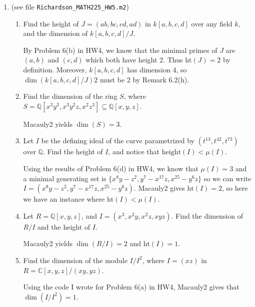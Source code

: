 \documentclass[11pt,oneside,english]{amsart}
\theoremstyle{definition}
\begin{document}
\begin{enumerate}[leftmargin=*]
\pagebreak

\item (see file \verb!Richardson_MATH225_HW5.m2!)

\begin{enumerate}
\item Find the height of $J = (ab,bc,cd,ad)$ in $k[a,b,c,d]$ over any field $k$, and the dimension of $k[a,b,c,d]/J$.

By Problem 6(b) in HW4, we know that the minimal primes of $J$ are $(a,b)$ and $(c,d)$ which both have height 2. Thus $\text{ht}(J)=2$ by definition. Moreover, $k[a,b,c,d]$ has dimension 4, so $\dim(k[a,b,c,d]/J)2$ must be 2 by Remark 6.2(h).
 
\item Find the dimension of the ring $S$, where $S = \mathbb{Q}[x^3y^3, x^3y^2z, x^2z^3] \subseteq \mathbb{Q}[x,y,z]$.

Macauly2 yields $\dim(S)=3$.

\item Let $I$ be the defining ideal of the curve parametrized by $(t^{13},t^{42},t^{73})$ over $\mathbb{Q}$. Find the height of $I$, and notice that $\textrm{height}(I) < \mu(I)$.

Using the results of Problem 6(d) in HW4, we know that $\mu(I)=3$ and a minimal generating set is $\{x^8y-z^2,y^7-x^{17}z,x^{25}-y^6z\}$ so we can write $I=(x^8y-z^2,y^7-x^{17}z,x^{25}-y^6z)$. Macauly2 gives $\text{ht}(I)=2$, so here we have an instance where $\text{ht}(I)<\mu(I)$.

\item Let $R=\mathbb{Q}[x,y,z]$, and $I=(x^3, x^2y, x^2z, xyz)$. Find the dimension of $R/I$ and the height of $I$.

Macauly2 yields $\dim(R/I)=2$ and $\text{ht}(I)=1$.
\item Find the dimension of the module $I/I^2$, where $I = (xz)$ in $R = \mathbb{C}[x,y,z]/(xy,yz)$.

Using the code I wrote for Problem 6(a) in HW4, Macauly2 gives that $\dim(I/I^2)=1$.
\end{enumerate}

\end{enumerate}
\end{document}
